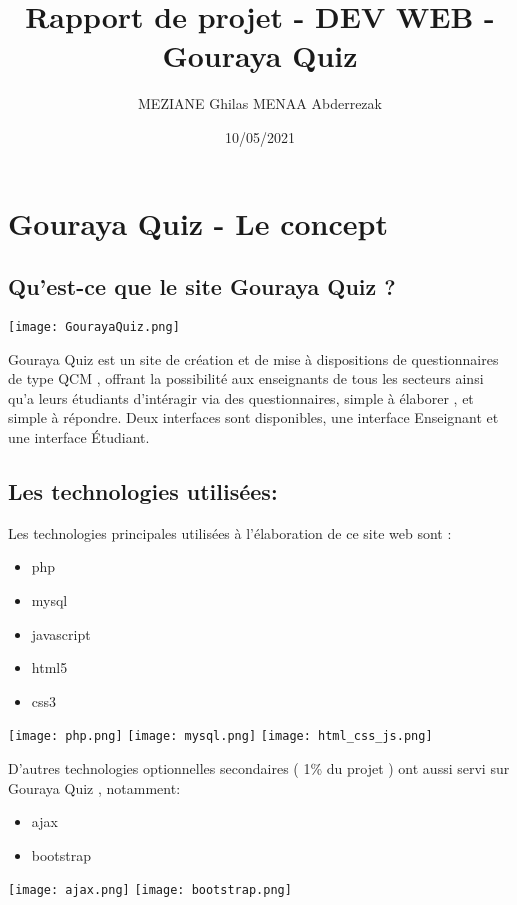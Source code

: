 \documentclass[12pt,a4paper]{article}
\title{Rapport de projet - DEV WEB - Gouraya Quiz} %
\author{MEZIANE Ghilas MENAA Abderrezak} %
\date{10/05/2021} %
\begin{document}
\maketitle

\tableofcontents

\newpage

\section{Gouraya Quiz - Le concept}
\subsection{Qu'est-ce que le site Gouraya Quiz ?}
\begin{center}
   \texttt{[image: GourayaQuiz.png]}
  \end{center}
 Gouraya Quiz est un site de création et de mise à dispositions de questionnaires de type QCM , offrant la possibilité aux enseignants de tous les secteurs ainsi qu'a leurs étudiants d'intéragir via des questionnaires, simple à élaborer , et simple à répondre. Deux interfaces sont disponibles, une interface Enseignant et une interface Étudiant. 
  
\subsection{Les technologies utilisées:}
  Les technologies principales utilisées à l'élaboration de ce site web sont : 
\begin{itemize}
\item php
\item mysql
\item javascript
\item html5
\item css3
\end{itemize}
\begin{center}
\texttt{[image: php.png]}
\texttt{[image: mysql.png]}
\texttt{[image: html\_css\_js.png]}
\end{center}

D'autres technologies optionnelles secondaires ( 1\% du projet ) ont aussi servi sur Gouraya Quiz , notamment: 
\begin{itemize}
\item ajax
\item bootstrap
\end{itemize}
\begin{center}
\texttt{[image: ajax.png]}
\texttt{[image: bootstrap.png]}
\end{center}
\end{document}

